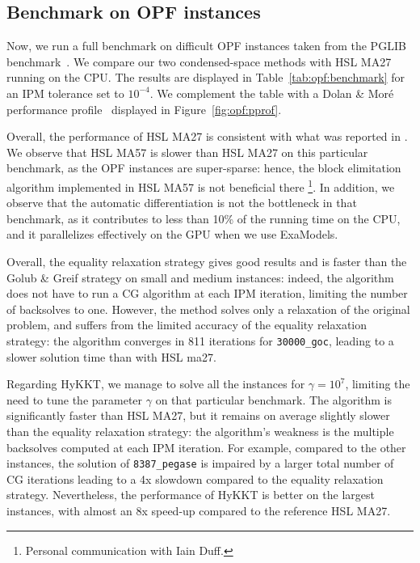\subsection{Benchmark on OPF instances}
\label{sec:num:opf}
Now, we run a full benchmark on difficult OPF instances taken
from the PGLIB benchmark~\cite{babaeinejadsarookolaee2019power}.
We compare our two condensed-space methods with HSL MA27 running
on the CPU. The results are displayed in Table~\ref{tab:opf:benchmark}
for an IPM tolerance set to $10^{-4}$.
We complement the table with a Dolan \& Moré performance profile~\cite{dolan2002benchmarking} displayed
in Figure~\ref{fig:opf:pprof}.

Overall, the performance of HSL MA27 is consistent with what was reported
in \cite{babaeinejadsarookolaee2019power}. We observe that HSL MA57 is slower
than HSL MA27 on this particular benchmark, as the OPF instances are super-sparse:
hence, the block elimitation algorithm implemented in HSL MA57 is not beneficial there
\footnote{Personal communication with Iain Duff.}. In addition, we observe that
the automatic differentiation is not the bottleneck in that benchmark, as it contributes to less than 10\% of
the running time on the CPU, and it parallelizes effectively on the GPU when we use ExaModels.

Overall, the equality relaxation strategy gives good results and is faster than
the Golub \& Greif strategy on small and medium instances: indeed, the algorithm
does not have to run a CG algorithm at each IPM iteration, limiting the number
of backsolves to one. However, the method solves only a relaxation of the original
problem, and suffers from the limited accuracy of the equality relaxation strategy:
the algorithm converges in 811 iterations for {\tt 30000\_goc}, leading to a slower
solution time than with HSL ma27.

Regarding HyKKT, we manage to solve all the instances for $\gamma = 10^7$, limiting
the need to tune the parameter $\gamma$ on that particular benchmark. The algorithm
is significantly faster than HSL MA27, but it remains on average slightly slower
than the equality relaxation strategy: the algorithm's weakness is the multiple
backsolves computed at each IPM iteration. For example, compared
to the other instances, the solution of {\tt 8387\_pegase} is impaired
by a larger total number of CG iterations leading to a 4x slowdown compared
to the equality relaxation strategy.
Nevertheless, the performance of HyKKT is better on the largest instances,
with almost an 8x speed-up compared to the reference HSL MA27.

